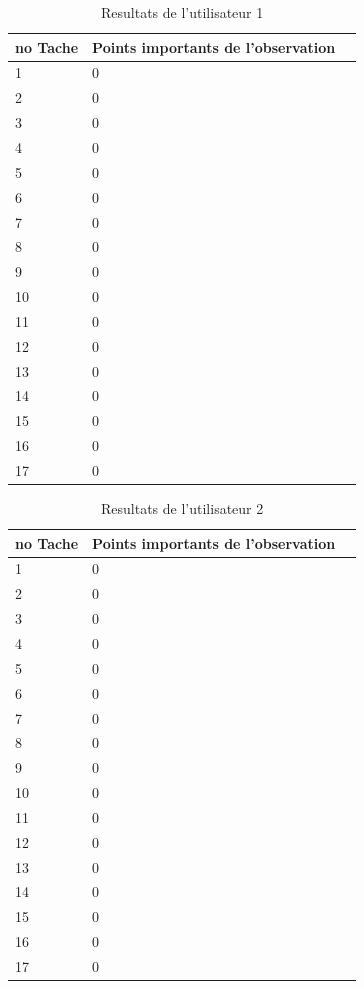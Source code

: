 \documentclass[letterpaper, oneside, 12pt, these, creativecommons]{thETS}
\begin{document}
\begin{table}
	\centering
	\begin{tabular}{|l|l|l|}
	\hline
	no Tache	& Points importants de l'observation	\\ \hline
	1		& 0						\\ \hline
	2		& 0						\\ \hline
	3		& 0						\\ \hline
	4		& 0						\\ \hline
	5		& 0						\\ \hline
	6		& 0						\\ \hline
	7		& 0						\\ \hline
	8		& 0						\\ \hline
	9		& 0						\\ \hline
	10		& 0						\\ \hline
	11		& 0						\\ \hline
	12		& 0						\\ \hline
	13		& 0						\\ \hline
	14		& 0						\\ \hline
	15		& 0						\\ \hline
	16		& 0						\\ \hline
	17		& 0						\\ \hline
	\end{tabular}
	\caption{Resultats de l'utilisateur 1}
\end{table}

\newpage

\begin{table}
	\centering
	\begin{tabular}{|l|l|l|}
	\hline
	no Tache	& Points importants de l'observation	\\ \hline
	1		& 0						\\ \hline
	2		& 0						\\ \hline
	3		& 0						\\ \hline
	4		& 0						\\ \hline
	5		& 0						\\ \hline
	6		& 0						\\ \hline
	7		& 0						\\ \hline
	8		& 0						\\ \hline
	9		& 0						\\ \hline
	10		& 0						\\ \hline
	11		& 0						\\ \hline
	12		& 0						\\ \hline
	13		& 0						\\ \hline
	14		& 0						\\ \hline
	15		& 0						\\ \hline
	16		& 0						\\ \hline
	17		& 0						\\ \hline
	\end{tabular}
	\caption{Resultats de l'utilisateur 2}
\end{table}
\end{document}
